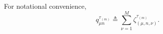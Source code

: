 \documentclass[journal,twoside,web]{ieeecolor}
\begin{document}
\begin{figure*}[ht]
\raggedright
For notational convenience, 
\begin{equation}
    q_{\mu n}^{\tau_{(m)}} \triangleq \sum_{\nu=1}^{M} \zeta_{(\mu,n,\nu)}^{\tau_{(m)}}.
\end{equation}
\end{figure*}

\end{document}
